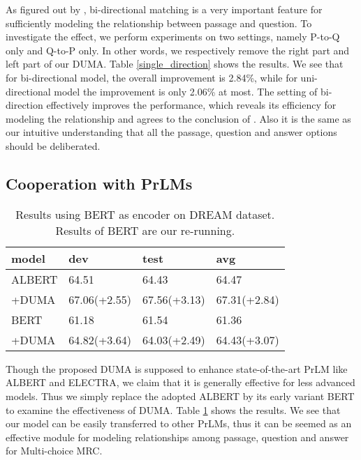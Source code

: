 \documentclass[letterpaper]{article} \usepackage{aaai21}  \usepackage{times}  \usepackage{helvet} \usepackage{courier}  \usepackage[hyphens]{url}  \usepackage{graphicx} \urlstyle{rm} \def\UrlFont{\rm}  \usepackage{natbib}  \usepackage{caption} \frenchspacing  \setlength{\pdfpagewidth}{8.5in}  \setlength{\pdfpageheight}{11in}
\begin{document}
As figured out by \cite{dcmn}, bi-directional matching is a very important feature for sufficiently modeling the relationship between passage and question. To investigate the effect, we perform experiments on two settings, namely P-to-Q only and Q-to-P only. In other words, we respectively remove the right part and left part of our DUMA. Table \ref{single_direction} shows the results. We see that for bi-directional model, the overall improvement is 2.84\%, while for uni-directional model the improvement is only 2.06\% at most. The setting of bi-direction effectively improves the performance, which reveals its efficiency for modeling the relationship and agrees to the conclusion of \cite{dcmn}. Also it is the same as our intuitive understanding that all the passage, question and answer options should be deliberated.

\subsection{Cooperation with PrLMs} \label{with_bert}
\begin{table}[t]\small
\renewcommand\arraystretch{1.2}
	\centering
	{
		\begin{tabular}{p{1.6cm}|p{1.6cm}|p{1.6cm}|p{1.6cm}}
			\hline		
			 model & dev & test &avg \\
			\hline
			\hline
			ALBERT & 64.51 & 64.43 &64.47 \\
			\;\;+DUMA &  67.06\;(+2.55) & 67.56\;(+3.13) & 67.31\;(+2.84)\\
			\hline
			BERT & 61.18  &  61.54 & 61.36 \\
			\;\;+DUMA & 64.82\;(+3.64) & 64.03\;(+2.49) & 64.43\;(+3.07) \\
			\hline
		\end{tabular}
		
	}
	\caption{\label{bert_result} Results using BERT as encoder on DREAM dataset. Results of BERT are our re-running.}
\end{table}

Though the proposed DUMA is supposed to enhance state-of-the-art PrLM like ALBERT and ELECTRA, we claim that it is generally effective for less advanced models. Thus we simply replace the adopted ALBERT by its early variant BERT to examine the effectiveness of DUMA. Table \ref{bert_result} shows the results. We see that our model can be easily transferred to other PrLMs, thus it can be seemed as an effective module for modeling relationships among passage, question and answer for Multi-choice MRC.
\end{document}
